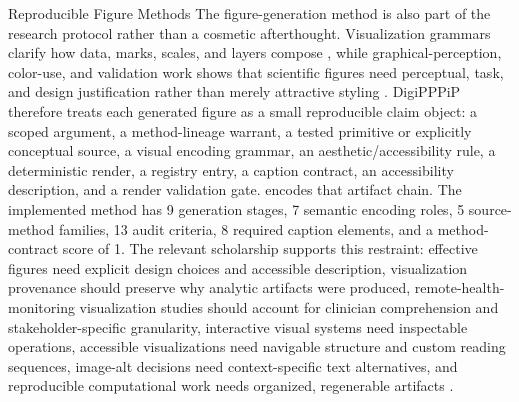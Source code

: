 \documentclass[
  ignorenonframetext,
]{beamer}
\begin{document}
\begin{frame}{Reproducible Figure Methods}
\protect{}\label{reproducible-figure-methods}
The figure-generation method is also part of the research protocol
rather than a cosmetic afterthought. Visualization grammars clarify how
data, marks, scales, and layers compose , while
graphical-perception, color-use, and validation work shows that
scientific figures need perceptual, task, and design justification
rather than merely attractive styling . DigiPPPiP therefore treats
each generated figure as a small reproducible claim object: a scoped
argument, a method-lineage warrant, a tested primitive or explicitly
conceptual source, a visual encoding grammar, an aesthetic/accessibility
rule, a deterministic render, a registry entry, a caption contract, an
accessibility description, and a render validation gate.
 encodes that artifact chain. The
implemented method has 9 generation stages, 7 semantic encoding roles, 5
source-method families, 13 audit criteria, 8 required caption elements,
and a method-contract score of 1. The relevant scholarship supports this
restraint: effective figures need explicit design choices and accessible
description, visualization provenance should preserve why analytic
artifacts were produced, remote-health-monitoring visualization studies
should account for clinician comprehension and stakeholder-specific
granularity, interactive visual systems need inspectable operations,
accessible visualizations need navigable structure and custom reading
sequences, image-alt decisions need context-specific text alternatives,
and reproducible computational work needs organized, regenerable
artifacts .


\end{frame}
\end{document}
